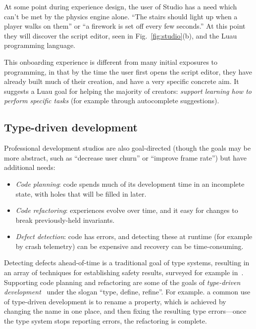 \documentclass[acmsmall]{acmart}
\begin{document}
At some point during experience design, the user of Studio has a need
which can't be met by the physics engine alone. ``The stairs should
light up when a player walks on them'' or ``a firework is set off
every few seconds.'' At this point they will discover the script
editor, seen in Fig.~\ref{fig:studio}(b), and the Luau programming language.

This onboarding experience is different from many initial exposures to
programming, in that by the time the user first opens the script
editor, they have already built much of their creation, and have a
very specific concrete aim.  It suggests a Luau goal for helping the
majority of creators: \emph{support learning how to perform specific
tasks} (for example through autocomplete suggestions).

\subsection{Type-driven development}

Professional development studios are also goal-directed (though the
goals may be more abstract, such as ``decrease user churn'' or
``improve frame rate'') but have additional needs:
\begin{itemize}

\item \emph{Code planning}:
  code spends much of its development time in an incomplete state,
  with holes that will be filled in later.

\item \emph{Code refactoring}:
  experiences evolve over time, and it easy for changes to
  break previously-held invariants.

\item \emph{Defect detection}:
  code has errors, and detecting these at runtime (for example by crash telemetry)
  can be expensive and recovery can be time-consuming.
  
\end{itemize}
Detecting defects ahead-of-time is a traditional goal of type systems,
resulting in an array of techniques for establishing safety results,
surveyed for example in~\cite{TAPL}. Supporting code planning and
refactoring are some of the goals of \emph{type-driven
development}~\cite{TDDIdris} under the slogan ``type, define,
refine''.  For example. a common use of type-driven development is to
rename a property, which is achieved by changing the name in one place,
and then fixing the resulting type errors---once the type system stops
reporting errors, the refactoring is complete.
\end{document}

